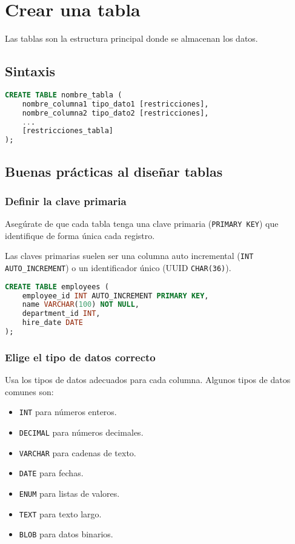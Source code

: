 \section{Crear una tabla}

Las tablas son la estructura principal donde se almacenan los datos.

\subsection{Sintaxis}

\begin{lstlisting}[language=SQL]
CREATE TABLE nombre_tabla (
    nombre_columna1 tipo_dato1 [restricciones],
    nombre_columna2 tipo_dato2 [restricciones],
    ...
    [restricciones_tabla]
);
\end{lstlisting}

\subsection{Buenas prácticas al diseñar tablas}

\subsubsection{Definir la clave primaria}

Asegúrate de que cada tabla tenga una clave primaria
(\texttt{PRIMARY KEY}) que identifique de forma única
cada registro.

Las claves primarias suelen ser una columna auto incremental
(\texttt{INT AUTO\_INCREMENT}) o un identificador único
(UUID \texttt{CHAR(36)}).

\begin{lstlisting}[language=SQL]
CREATE TABLE employees (
    employee_id INT AUTO_INCREMENT PRIMARY KEY,
    name VARCHAR(100) NOT NULL,
    department_id INT,
    hire_date DATE
);
\end{lstlisting}

\subsubsection{Elige el tipo de datos correcto}

Usa los tipos de datos adecuados para cada columna.
Algunos tipos de datos comunes son:

\begin{itemize}
    \item \texttt{INT} para números enteros.
    \item \texttt{DECIMAL} para números decimales.
    \item \texttt{VARCHAR} para cadenas de texto.
    \item \texttt{DATE} para fechas.
    \item \texttt{ENUM} para listas de valores.
    \item \texttt{TEXT} para texto largo.
    \item \texttt{BLOB} para datos binarios.
\end{itemize}

